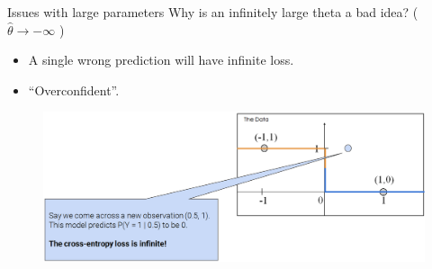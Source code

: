 \documentclass[aspectratio=169]{../latex_main/tntbeamer}  %
\begin{document}
	 
	 \begin{frame}{Issues with large parameters}
	             Why is an infinitely large theta a bad idea? (     $\hat{\theta} \rightarrow -\infty$             )
	            \begin{itemize}
	                \item A single wrong prediction will have infinite loss.
	                \item “Overconfident”.
	            \end{itemize}  
	                \begin{figure}
	                    \centering
	                    \includegraphics[scale=.33]{Bild43}
	                \end{figure}
	 \end{frame}
	 
	 
	 
\end{document}
